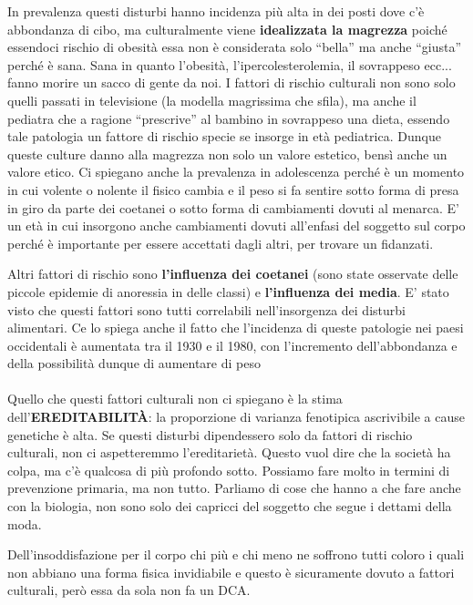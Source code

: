 In prevalenza questi disturbi hanno incidenza più alta in dei posti dove
c'è abbondanza di cibo, ma culturalmente viene \textbf{idealizzata la
magrezza} poiché essendoci rischio di obesità essa non è considerata
solo ``bella'' ma anche ``giusta'' perché è sana. Sana in quanto
l'obesità, l'ipercolesterolemia, il sovrappeso ecc... fanno morire un
sacco di gente da noi. I fattori di rischio culturali non sono solo
quelli passati in televisione (la modella magrissima che sfila), ma
anche il pediatra che a ragione ``prescrive'' al bambino in sovrappeso
una dieta, essendo tale patologia un fattore di rischio specie se
insorge in età pediatrica. Dunque queste culture danno alla magrezza non
solo un valore estetico, bensì anche un valore etico. Ci spiegano anche
la prevalenza in adolescenza perché è un momento in cui volente o
nolente il fisico cambia e il peso si fa sentire sotto forma di presa in
giro da parte dei coetanei o sotto forma di cambiamenti dovuti al
menarca. E' un età in cui insorgono anche cambiamenti dovuti all'enfasi
del soggetto sul corpo perché è importante per essere accettati dagli
altri, per trovare un fidanzati.

Altri fattori di rischio sono \textbf{l'influenza dei coetanei} (sono
state osservate delle piccole epidemie di anoressia in delle classi) e
\textbf{l'influenza dei media}. E' stato visto che questi fattori sono
tutti correlabili nell'insorgenza dei disturbi alimentari. Ce lo spiega
anche il fatto che l'incidenza di queste patologie nei paesi occidentali
è aumentata tra il 1930 e il 1980, con l'incremento dell'abbondanza e
della possibilità dunque di aumentare di peso
\\\\
Quello che questi fattori culturali non ci spiegano è la stima
dell'\textbf{EREDITABILITÀ}: la proporzione di varianza fenotipica
ascrivibile a cause genetiche è alta. Se questi disturbi dipendessero
solo da fattori di rischio culturali, non ci aspetteremmo
l'ereditarietà. Questo vuol dire che la società ha colpa, ma c'è
qualcosa di più profondo sotto. Possiamo fare molto in termini di
prevenzione primaria, ma non tutto. Parliamo di cose che hanno a che
fare anche con la biologia, non sono solo dei capricci del soggetto che
segue i dettami della moda.

Dell'insoddisfazione per il corpo chi più e chi meno ne soffrono tutti
coloro i quali non abbiano una forma fisica invidiabile e questo è
sicuramente dovuto a fattori culturali, però essa da sola non fa un DCA.

